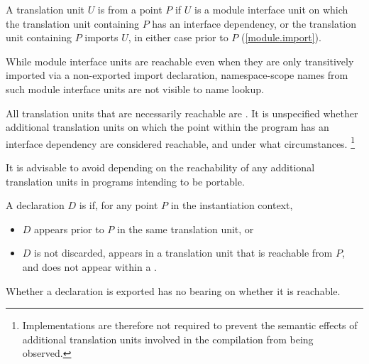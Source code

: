 \pnum
A translation unit $U$ is
from a point $P$ if
$U$ is a module interface unit on which the translation unit containing $P$
has an interface dependency, or
the translation unit containing $P$ imports $U$,
in either case prior to $P$ (\ref{module.import}).
\begin{note}
While module interface units are reachable even when they are only
transitively imported via a non-exported import declaration,
namespace-scope names from such module interface units are not visible
to name lookup.
\end{note}

\pnum
All translation units that are necessarily reachable are
.
It is unspecified whether additional translation units on which the
point within the program has an interface dependency are considered reachable,
and under what circumstances.%
\footnote{Implementations are therefore not required to prevent the semantic
effects of additional translation units involved in the compilation from being
observed.}
\begin{note}
It is advisable to avoid
depending on the reachability of any additional translation units
in programs intending to be portable.
\end{note}

\pnum
A declaration $D$ is
 if,
for any point $P$ in the
instantiation context,
\begin{itemize}
\item $D$ appears prior to $P$ in the same translation unit, or
\item $D$ is not discarded,
appears in a translation unit that is
reachable from $P$,
and
does not appear within a .
\end{itemize}
\begin{note}
Whether a declaration is exported has no bearing on whether it is reachable.
\end{note}


